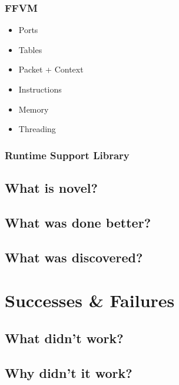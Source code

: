 \subsubsection{FFVM}
\begin{itemize}
\item Ports
\item Tables
\item Packet + Context
\item Instructions
\item Memory
\item Threading
\end{itemize}

\subsubsection{Runtime Support Library}

\subsection{What is novel?}

\subsection{What was done better?}

\subsection{What was discovered?}

\section{Successes \& Failures}

\subsection{What didn't work?}

\subsection{Why didn't it work?}